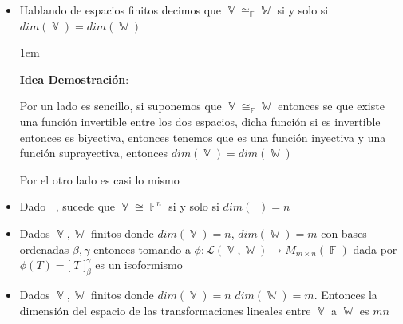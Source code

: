 \documentclass[12pt, fleqn]{report}                             %
\newenvironment{SmallIndentation}[1][0.75em]                    %
        {\begin{adjustwidth}{#1}{}\begin{footnotesize}}             %
        {\end{footnotesize}\end{adjustwidth}}                       %
\theoremstyle{break}                                            %
\DeclareMathOperator \GenericField {\mathbb{F}}                 %
\DeclareMathOperator \VectorSet    {\mathbb{V}}                 %
\DeclareMathOperator \SubVectorSet {\mathbb{W}}                 %
\DeclareMathOperator \VectorSpace  {\VectorSet_{\GenericField}} %
\newcommand{\BigBrackets}[1]    {\Big[ \; #1 \; \Big]}          %
\begin{document}
                \begin{itemize}

                    \item
                        Hablando de espacios finitos decimos que
                        $\VectorSet \cong_{\GenericField} \SubVectorSet$ si y solo si 
                        $dim(\VectorSet) = dim(\SubVectorSet)$

                        \begin{SmallIndentation}[1em]
                            \textbf{Idea Demostración}:

                            Por un lado es sencillo, si suponemos que $\VectorSet \cong_{\GenericField} \SubVectorSet$
                            entonces se que existe una función invertible entre los dos espacios, dicha
                            función si es invertible entonces es biyectiva, entonces tenemos que
                            es una función inyectiva y una función suprayectiva, entonces
                            $dim(\VectorSet) = dim(\SubVectorSet)$

                            Por el otro lado es casi lo mismo
                        
                        \end{SmallIndentation}

                    \item
                        Dado $\VectorSpace$, sucede que $\VectorSet \cong \GenericField^n$ si y solo si
                        $dim(\VectorSpace) = n$ 

                    \item
                        Dados $\VectorSet, \SubVectorSet$ finitos donde $dim(\VectorSet) = n$,
                        $dim(\SubVectorSet) = m$ con bases ordenadas $\beta, \gamma$ entonces tomando
                        a $\phi : \mathscr{L}(\VectorSet, \SubVectorSet) \to M_{m \times n}(\GenericField)$
                        dada por $\phi(T) = \BigBrackets{T}_\beta^\gamma$ es un isoformismo

                    \item
                        Dados $\VectorSet, \SubVectorSet$ finitos donde $dim(\VectorSet) = n$
                        $dim(\SubVectorSet) = m$. Entonces la dimensión del espacio de las transformaciones
                        lineales entre $\VectorSet$ a $\SubVectorSet$ es $mn$


\end{itemize}
\end{document}
